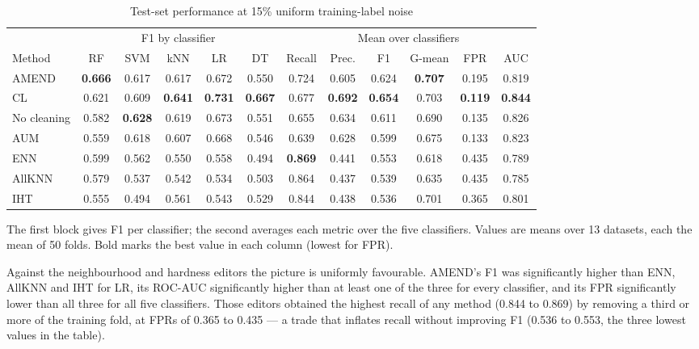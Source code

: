 \documentclass[conference]{IEEEtran}
\begin{document}
\begin{table}[!t]
\centering
\footnotesize
\caption{Test-set performance at 15\% uniform training-label noise}
\label{tab:3}
\setlength{\tabcolsep}{3.5pt}
\begin{adjustbox}{max width=\linewidth}
\begin{tabular}{lccccccccccc}
\hline
& \multicolumn{5}{c}{F1 by classifier} & \multicolumn{6}{c}{Mean over classifiers} \\
Method & RF & SVM & kNN & LR & DT & Recall & Prec. & F1 & G-mean & FPR & AUC \\
\hline
AMEND & \textbf{0.666} & 0.617 & 0.617 & 0.672 & 0.550 & 0.724 & 0.605 & 0.624 & \textbf{0.707} & 0.195 & 0.819 \\
CL & 0.621 & 0.609 & \textbf{0.641} & \textbf{0.731} & \textbf{0.667} & 0.677 & \textbf{0.692} & \textbf{0.654} & 0.703 & \textbf{0.119} & \textbf{0.844} \\
No cleaning & 0.582 & \textbf{0.628} & 0.619 & 0.673 & 0.551 & 0.655 & 0.634 & 0.611 & 0.690 & 0.135 & 0.826 \\
AUM & 0.559 & 0.618 & 0.607 & 0.668 & 0.546 & 0.639 & 0.628 & 0.599 & 0.675 & 0.133 & 0.823 \\
ENN & 0.599 & 0.562 & 0.550 & 0.558 & 0.494 & \textbf{0.869} & 0.441 & 0.553 & 0.618 & 0.435 & 0.789 \\
AllKNN & 0.579 & 0.537 & 0.542 & 0.534 & 0.503 & 0.864 & 0.437 & 0.539 & 0.635 & 0.435 & 0.785 \\
IHT & 0.555 & 0.494 & 0.561 & 0.543 & 0.529 & 0.844 & 0.438 & 0.536 & 0.701 & 0.365 & 0.801 \\
\hline
\end{tabular}
\end{adjustbox}
\par\vspace{3pt}
\begin{minipage}{\linewidth}\scriptsize The first block gives F1 per classifier; the second averages each metric over the five classifiers. Values are means over 13 datasets, each the mean of 50 folds. Bold marks the best value in each column (lowest for FPR).\end{minipage}
\end{table}

Against the neighbourhood and hardness editors the picture is uniformly favourable. AMEND's F1 was significantly higher than ENN, AllKNN and IHT for LR, its ROC-AUC significantly higher than at least one of the three for every classifier, and its FPR significantly lower than all three for all five classifiers. Those editors obtained the highest recall of any method (0.844 to 0.869) by removing a third or more of the training fold, at FPRs of 0.365 to 0.435 --- a trade that inflates recall without improving F1 (0.536 to 0.553, the three lowest values in the table).
\end{document}
